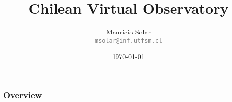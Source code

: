 \documentclass{beamer}
\title[Short title]{\huge{Chilean Virtual Observatory}}
\author{Mauricio Solar \\
        \small{\textcolor{gray}{\texttt{msolar@inf.utfsm.cl}}}}
\institute[CSRG-UTFSM]{
Universidad Técnica Fedrico Santa María
}
\date{\today}
\begin{document}
\begin{frame}[t,plain]
\titlepage
\end{frame}



\begin{frame}
	\frametitle{Overview}
	\tableofcontents
\end{frame}





\begin{frame}[t,plain]
\titlepage
\end{frame}
\end{document}
